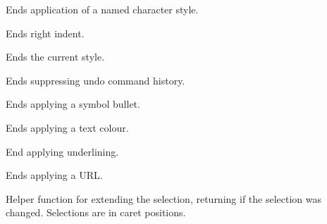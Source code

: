 
Ends application of a named character style.

\label{wxrichtextctrlendrightindent}


Ends right indent.

\label{wxrichtextctrlendstyle}


Ends the current style.

\label{wxrichtextctrlendsuppressundo}


Ends suppressing undo command history.

\label{wxrichtextctrlendsymbolbullet}


Ends applying a symbol bullet.

\label{wxrichtextctrlendtextcolour}


Ends applying a text colour.

\label{wxrichtextctrlendunderline}


End applying underlining.

\label{wxrichtextctrlendurl}


Ends applying a URL.

\label{wxrichtextctrlextendselection}


Helper function for extending the selection, returning \true if the selection was
changed. Selections are in caret positions.

\label{wxrichtextctrlfindnextwordposition}


